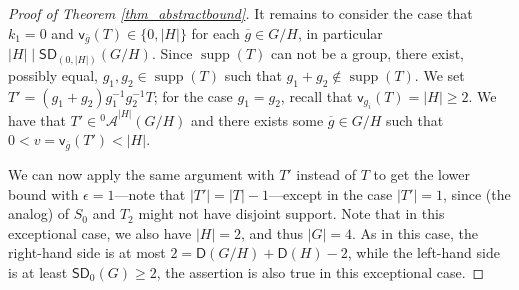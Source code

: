 \documentclass{amsart}
\theoremstyle{definition}
\numberwithin{equation}{section}
\begin{document}
\begin{proof}[Proof of Theorem \ref{thm_abstractbound}]
It remains to consider the case that $k_1= 0$ and $\mathsf{v}_{\overline{g}}(T) \in \{0, |H|\}$
for each $\overline{g} \in G/H$, in particular $|H| \mid {\mathsf{SD}}_{(0,|H|)}(G/H)$.
Since $\operatorname{supp}(T)$ can not be a group, there exist, possibly equal, $g_1, g_2 \in \operatorname{supp}(T)$ such that $g_1 + g_2 \notin \operatorname{supp}(T)$.
We set $T' = (g_1+g_2)g_1^{-1}g_2^{-1}T$; for the case $g_1=g_2$, recall that $\mathsf{v}_{g_i}(T)=|H| \ge 2$.
We have that $T' \in {{}^{{0}}\!\mathcal{A}}^{|H|} (G/H)$ and there exists some $\overline{g} \in G/H$ such
that $0 < v=\mathsf{v}_{\overline{g}}(T')< |H|$.

We can now apply the same argument with $T'$ instead of $T$ to get the lower bound with $\epsilon= 1$---note that $|T'|= |T|-1$---except in the case $|T'|=1$, since (the analog) of $S_0$ and $T_2$ might not have disjoint support.
Note that in this exceptional case, we also have $|H|=2$, and thus $|G|= 4$. As in this case,
the right-hand side is at most $2= {\mathsf{D}}(G/H)+{\mathsf{D}}(H)-2$, while the left-hand side is at least ${\mathsf{SD}}_0(G)\ge 2$,
the assertion is also true in this exceptional case.
\end{proof}
\end{document}
